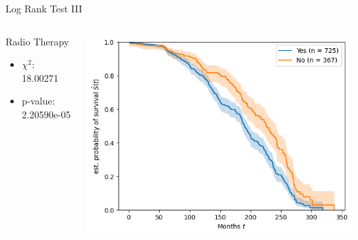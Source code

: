 \documentclass{beamer}
\begin{document}
\begin{frame}{Log Rank Test III}
    \begin{columns}
        \begin{column}{0.49 \textwidth}
        Radio Therapy
        \begin{itemize}
            \item $\chi^2$: 18.00271
            \item p-value: 2.20590e-05
        \end{itemize}
        \end{column}
        \begin{column}{0.49 \textwidth}
            \centering
            \includegraphics[width = \textwidth]{images/logrank3}
        \end{column}
    \end{columns}
\end{frame}
\end{document}
